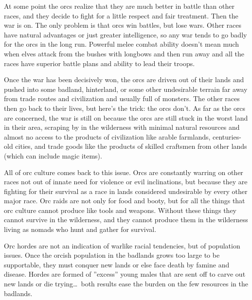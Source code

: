 At some point the orcs realize that they are much better in battle than other races, and they decide to fight for a little respect and fair treatment. Then the war is on. The only problem is that orcs win battles, but lose wars. Other races have natural advantages or just greater intelligence, so any war tends to go badly for the orcs in the long run. Powerful melee combat ability doesn't mean much when elves attack from the bushes with longbows and then run away and all the races have superior battle plans and ability to lead their troops.

Once the war has been decisively won, the orcs are driven out of their lands and pushed into some badland, hinterland, or some other undesirable terrain far away from trade routes and civilization and usually full of monsters. The other races then go back to their lives, but here's the trick: the orcs don't. As far as the orcs are concerned, the war is still on because the orcs are still stuck in the worst land in their area, scraping by in the wilderness with minimal natural resources and almost no access to the products of civilization like arable farmlands, centuries-old cities, and trade goods like the products of skilled craftsmen from other lands (which can include magic items).

All of orc culture comes back to this issue. Orcs are constantly warring on other races not out of innate need for violence or evil inclinations, but because they are fighting for their survival as a race in lands considered undesirable by every other major race. Orc raids are not only for food and booty, but for all the things that orc culture cannot produce like tools and weapons. Without these things they cannot survive in the wilderness, and they cannot produce them in the wilderness living as nomads who hunt and gather for survival.

Orc hordes are not an indication of warlike racial tendencies, but of population issues. Once the orcish population in the badlands grows too large to be supportable, they must conquer new lands or else face death by famine and disease. Hordes are formed of ''excess'' young males that are sent off to carve out new lands or die trying\ldots\  both results ease the burden on the few resources in the badlands.

